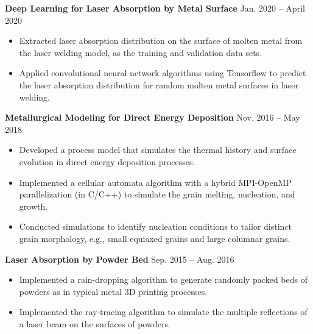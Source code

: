 \documentclass[11pt, letterpaper]{article}
\begin{document}
\textbf{Deep Learning for Laser Absorption by Metal Surface} \hfill Jan. 2020 -- April 2020
\begin{itemize}[leftmargin=*, labelsep=5mm]
   \item Extracted laser absorption distribution on the surface of molten metal from the laser
      welding model, as the training and validation data sets.
   \item Applied convolutional neural network algorithms using Tensorflow to predict the laser
      absorption distribution for random molten metal surfaces in laser welding.
\end{itemize}

\vspace{3pt}

\textbf{Metallurgical Modeling for Direct Energy Deposition} \hfill Nov. 2016 -- May 2018
\begin{itemize}[leftmargin=*, labelsep=5mm]
   \item Developed a process model that simulates the thermal history and surface evolution in
      direct energy deposition processes.
   \item Implemented a cellular automata algorithm with a hybrid MPI-OpenMP parallelization (in
      C/C++) to simulate the grain melting, nucleation, and growth. 
   \item Conducted simulations to identify nucleation conditions to tailor distinct grain
      morphology, e.g., small equiaxed grains and large columnar grains.
\end{itemize}

\vspace{3pt}

\textbf{Laser Absorption by Powder Bed} \hfill Sep. 2015 -- Aug. 2016
\begin{itemize}[leftmargin=*, labelsep=5mm]
   \item Implemented a rain-dropping algorithm to generate randomly packed beds of powders as in
      typical metal 3D printing processes.
   \item Implemented the ray-tracing algorithm to simulate the multiple reflections of a laser beam
      on the surfaces of powders.
\end{itemize}

\vspace{9pt}
\end{document}
